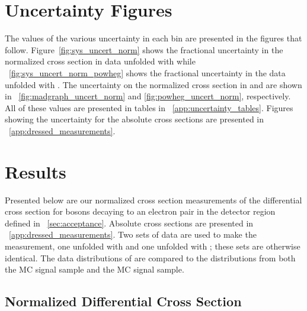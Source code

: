 \section{Uncertainty Figures}

The values of the various uncertainty in each \phistar bin are presented in the
figures that follow. Figure~\ref{fig:sys_uncert_norm} shows the fractional
uncertainty in the normalized \phistar cross section in data unfolded with
\MADGRAPH while \FIG~\ref{fig:sys_uncert_norm_powheg} shows the fractional
uncertainty in the data unfolded with \POWHEG. The uncertainty on the
normalized \phistar cross section in \MADGRAPH and \POWHEG are shown in
\FIGS~\ref{fig:madgraph_uncert_norm} and \ref{fig:powheg_uncert_norm},
respectively. All of these values are presented in tables in
\APP~\ref{app:uncertainty_tables}. Figures showing the uncertainty for the
absolute \phistar cross sections are presented in
\APP~\ref{app:dressed_measurements}.










\section{Results}
\label{sec:results}

Presented below are our normalized cross section measurements of the
differential \phistar cross section for \Z bosons decaying to an electron pair
in the detector region defined in \SEC~\ref{sec:acceptance}. Absolute cross
sections are presented in \APP~\ref{app:dressed_measurements}. Two sets of data
are used to make the measurement, one unfolded with \MADGRAPH and one unfolded
with \POWHEG; these sets are otherwise identical. The data distributions of
\phistar are compared to the distributions from both the \MADGRAPH MC signal
sample and the \POWHEG MC signal sample.

\subsection{Normalized Differential Cross Section}
\label{ssec:results_norm}

